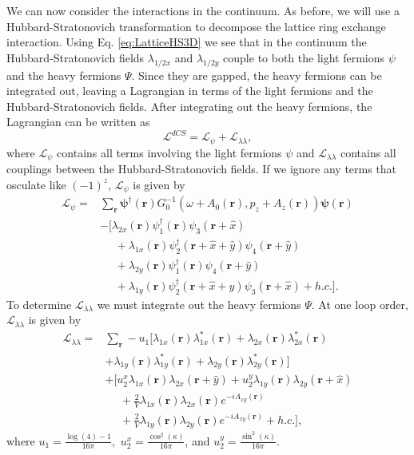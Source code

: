 \documentclass[prb,aps,twocolumn,groupaddress,floatfix]{revtex4-1}
\begin{document}
We can now consider the interactions in the continuum. As before, we will use a Hubbard-Stratonovich transformation to decompose the lattice ring exchange interaction. Using Eq. \ref{eq:LatticeHS3D} we see that in the continuum the Hubbard-Stratonovich fields $\lambda_{1/2x}$ and $\lambda_{1/2y}$ couple to both the light fermions $\psi$ and the heavy fermions $\Psi$. Since they are gapped, the heavy fermions can be integrated out, leaving a Lagrangian in terms of the light fermions and the Hubbard-Stratonovich fields. After integrating out the heavy fermions, the Lagrangian can be written as
\begin{equation}
\mathcal{L}^{dCS} = \mathcal{L}_{\psi} + \mathcal{L}_{\lambda\lambda}, 
\end{equation}
where $\mathcal{L}_{\psi}$ contains all terms involving the light fermions $\psi$ and $\mathcal{L}_{\lambda\lambda}$ contains all couplings between the Hubbard-Stratonovich fields. If we ignore any terms that osculate like $(-1)^z$, $\mathcal{L}_{\psi}$ is given by
\begin{equation}
\begin{split}
\mathcal{L}_{\psi} = &\sum_{\bm{r}} \bm{\psi}^\dagger(\bm{r})G^{-1}_0(\omega+A_0(\bm{r}),p_z+A_z(\bm{r}))\bm{\psi}(\bm{r})\\& - [ \lambda_{2x}(\bm{r}) \psi_1^\dagger(\bm{r})\psi_3(\bm{r}+\hat{x}) \\
&\phantom{=} + \lambda_{1x}(\bm{r})\psi_2^\dagger(\bm{r}+\hat{x}+\hat{y})\psi_4(\bm{r}+\hat{y}) \\
&\phantom{=}+\lambda_{2y}(\bm{r})\psi_1^\dagger(\bm{r})\psi_4(\bm{r}+\hat{y})\\
&\phantom{=}+\lambda_{1y}(\bm{r})\psi_2^\dagger(\bm{r}+\hat{x}+\hat{y})\psi_3(\bm{r}+\hat{x}) + h.c.].
\end{split}\label{Aeq:ContHS}
\end{equation}
To determine $\mathcal{L}_{\lambda\lambda}$ we must integrate out the heavy fermions $\Psi$. At one loop order, $\mathcal{L}_{\lambda\lambda}$ is given by
\begin{equation}
\begin{split}
\mathcal{L}_{\lambda\lambda} = &\sum_{\bm{r}} -u_1 [\lambda_{1x}(\bm{r})\lambda^*_{1x}(\bm{r})+ \lambda_{2x}(\bm{r})\lambda^*_{2x}(\bm{r}) \\
&+ \lambda_{1y}(\bm{r})\lambda^*_{1y}(\bm{r})+ \lambda_{2y}(\bm{r})\lambda^*_{2y}(\bm{r})] \\
&+ [u^x_2 \lambda_{1x}(\bm{r})\lambda_{2x}(\bm{r}+\hat{y}) + u^y_2 \lambda_{1y}(\bm{r})\lambda_{2y}(\bm{r}+\hat{x}) \\
&\phantom{=} + \frac{2}{V}\lambda_{1x}(\bm{r})\lambda_{2x}(\bm{r})e^{-iA_{xy}(\bm{r})}\\ &\phantom{=} + \frac{2}{V}\lambda_{1y}(\bm{r})\lambda_{2y}(\bm{r})e^{-iA_{xy}(\bm{r})}
+ h.c.],
\end{split}\label{Aeq:AdditionalInteractions}
\end{equation}
where $u_1 = \frac{\log(4)-1}{16\pi},$  $u^x_2 = \frac{\cos^2(\kappa)}{16\pi}$, and $u^y_2 = \frac{\sin^2(\kappa)}{16\pi}$. 
\end{document}
